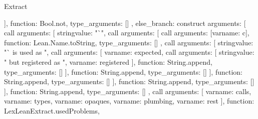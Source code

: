 \begin{lexlean}{Extract}
\begin{toolingmodule}
{{{{{{{{{{{                          ],
                          function: Bool.not,
                          type_arguments: []
                        }
                      },
                      else_branch: construct{
                        arguments: [
                          call{
                            arguments: [
                              string{value: "`"},
                              call{
                                arguments: [
                                  call{
                                    arguments: [var{name: c}],
                                    function: Lean.Name.toString,
                                    type_arguments: []
                                  },
                                  call{
                                    arguments: [
                                      string{value: "` is used as "},
                                      call{
                                        arguments: [
                                          var{name: expected},
                                          call{
                                            arguments: [
                                              string{value: " but registered as "},
                                              var{name: registered}
                                            ],
                                            function: String.append,
                                            type_arguments: []
                                          }
                                        ],
                                        function: String.append,
                                        type_arguments: []
                                      }
                                    ],
                                    function: String.append,
                                    type_arguments: []
                                  }
                                ],
                                function: String.append,
                                type_arguments: []
                              }
                            ],
                            function: String.append,
                            type_arguments: []
                          },
                          call{
                            arguments: [
                              var{name: calls},
                              var{name: types},
                              var{name: opaques},
                              var{name: plumbing},
                              var{name: rest}
                            ],
                            function: LexLeanExtract.usedProblems,
}}}}}}}}}}}
\end{toolingmodule}
\end{lexlean}
